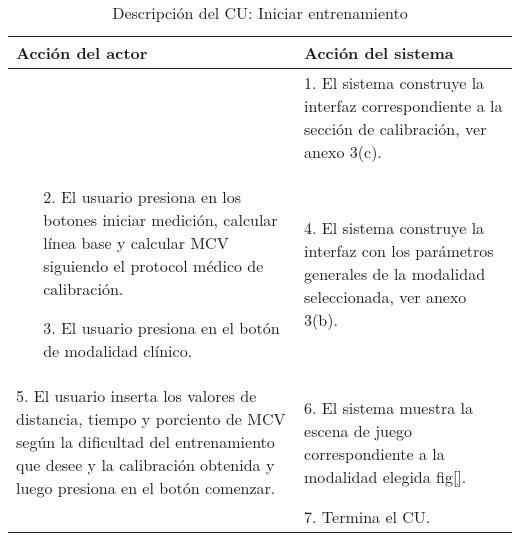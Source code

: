 \begin{center}
\begin{table}
\begin{tabularx}{\textwidth}{|X|X|}
            Acción del actor & Acción del sistema \\\hline
                
            & 
            1. El sistema construye la interfaz correspondiente a la sección de calibración, ver anexo 3(c). \\\hline
            \begin{enumerate}
                \item[2.] El usuario presiona en los botones iniciar medición, calcular línea base y calcular MCV siguiendo el protocol médico de calibración.
                \item[3.] El usuario presiona en el botón de modalidad clínico.
            \end{enumerate}
            &
            4. El sistema construye la interfaz con los parámetros generales de la modalidad seleccionada, ver anexo 3(b). \\\hline
            5. El usuario inserta los valores de distancia, tiempo y porciento de MCV según la dificultad del entrenamiento que desee y la calibración obtenida y luego presiona en el botón comenzar. 
            & 
            6. El sistema muestra la escena de juego correspondiente a la modalidad elegida fig\ref{}. \\ &7. Termina el CU. \\\hline
            

            
            


        \end{tabularx}

        \caption{Descripción del CU: Iniciar entrenamiento}
    \end{table}
\end{center}